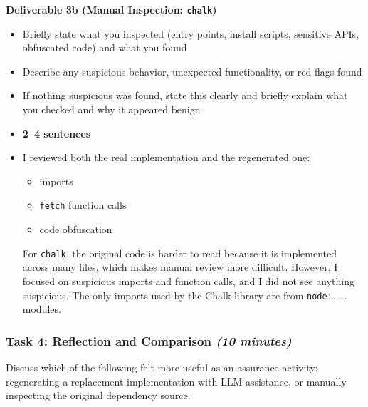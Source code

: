 \begin{tcolorbox}[colback=yellow!10,colframe=black,boxrule=0.5pt]
\textbf{Deliverable 3b (Manual Inspection: \texttt{chalk})}

\begin{itemize}
    \item Briefly state what you inspected (\eg entry points, install scripts, sensitive APIs, obfuscated code) and what you found
    \item Describe any suspicious behavior, unexpected functionality, or red flags found
    \item If nothing suspicious was found, state this clearly and briefly explain
          what you checked and why it appeared benign
    \item \textbf{2--4 sentences}
\end{itemize}
\end{tcolorbox}

\begin{tcolorbox}[colback=blue!10,colframe=blue!70!black,boxrule=0.5pt]
\begin{itemize}
    \item I reviewed both the real implementation and the regenerated one:
    \begin{itemize}
        \item imports
        \item \texttt{fetch} function calls
        \item code obfuscation
    \end{itemize}

    For \texttt{chalk}, the original code is harder to read because it is implemented across many files, which makes manual review more difficult. However, I focused on suspicious imports and function calls, and I did not see anything suspicious. The only imports used by the Chalk library are from \texttt{node:...} modules.
\end{itemize}
\end{tcolorbox}

\subsubsection{Task 4: Reflection and Comparison \textnormal{\textit{(10 minutes)}}}

Discuss which of the following felt more useful as an assurance activity:
regenerating a replacement implementation with LLM assistance, or manually inspecting
the original dependency source.

